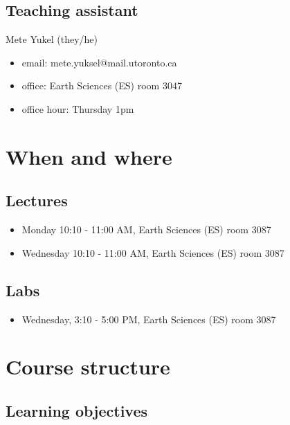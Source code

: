 \documentclass[
]{article}
\providecommand{\tightlist}{%
  \setlength{\itemsep}{0pt}\setlength{\parskip}{0pt}}
\begin{document}
\hypertarget{teaching-assistant}{%
\subsection{Teaching assistant}\label{teaching-assistant}}

Mete Yukel (they/he)

\begin{itemize}
\tightlist
\item
  email: mete.yuksel@mail.utoronto.ca
\item
  office: Earth Sciences (ES) room 3047
\item
  office hour: Thursday 1pm
\end{itemize}

\hypertarget{when-and-where}{%
\section{When and where}\label{when-and-where}}

\hypertarget{lectures}{%
\subsection{Lectures}\label{lectures}}

\begin{itemize}
\tightlist
\item
  Monday 10:10 - 11:00 AM, Earth Sciences (ES) room 3087
\item
  Wednesday 10:10 - 11:00 AM, Earth Sciences (ES) room 3087
\end{itemize}

\hypertarget{labs}{%
\subsection{Labs}\label{labs}}

\begin{itemize}
\tightlist
\item
  Wednesday, 3:10 - 5:00 PM, Earth Sciences (ES) room 3087
\end{itemize}

\hypertarget{course-structure}{%
\section{Course structure}\label{course-structure}}

\hypertarget{learning-objectives}{%
\subsection{Learning objectives}\label{learning-objectives}}
\end{document}
